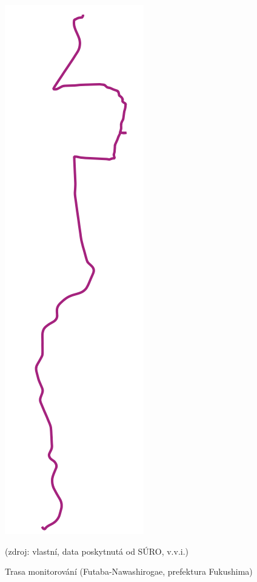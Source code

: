\begin{figure}[H] \centering
    \includegraphics[scale=0.2]{./pictures/trasa_monitorovani.png}
      	\caption[Trasa monitorování (Futaba-Nawashirogae, prefektura
Fukushima)]{Trasa monitorování (Futaba-Nawashirogae, prefektura
Fukushima)}(zdroj: vlastní, data poskytnutá od SÚRO, v.v.i.)
    	\label{fig:interpolatedMap}
\end{figure}

